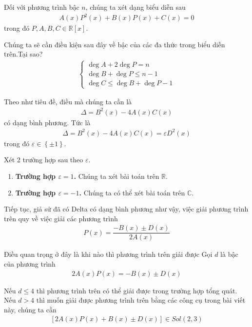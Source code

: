 \documentclass[a4paper,oneside]{book}
\numberwithin{equation}{chapter}
\begin{document}
Đối với phương trình bậc $n$, chúng ta xét dạng biểu diễn sau
\begin{align}
A\left( x \right){P^2}\left( x \right) + B\left( x \right)P\left( x \right) + C\left( x \right) = 0
\end{align}
trong đó $P,A,B,C \in \mathbb{R} \left[ x \right]$.

Chúng ta sẽ cần điều kiện sau đây về bậc của các đa thức trong biểu diễn trên.Tại sao?
\begin{align}
\left\{ {\begin{array}{*{20}{c}}
{\deg A + 2\deg P = n}\\
{\deg B + \deg P \le n - 1}\\
{\deg C \le \deg B + \deg P - 1}
\end{array}} \right.
\end{align}

Theo như tiêu đề, điều mà chúng ta cần là 
\begin{align}
\Delta  = {B^2}\left( x \right) - 4A\left( x \right)C\left( x \right)
\end{align}
có dạng bình phương. Tức là
\begin{align}
\Delta  = {B^2}\left( x \right) - 4A\left( x \right)C\left( x \right) = \varepsilon {D^2}\left( x \right)
\end{align}
trong đó $\varepsilon  \in \left\{ { \pm 1} \right\}$.

Xét 2 trường hợp sau theo $\varepsilon$.
\begin{enumerate}
\item \textbf{Trường hợp $\varepsilon  = 1$.} Chúng ta xét bài toán trên $\mathbb{R}$.
\item \textbf{Trường hợp $\varepsilon  = -1$.} Chúng ta có thể xét bài toán trên $\mathbb{C}$.
\end{enumerate}

Tiếp tục, giả sử đã có Delta có dạng bình phương như vậy, việc giải phương trình trên quy về việc giải các phương trình
\begin{align}
P\left( x \right) = \dfrac{{ - B\left( x \right) \pm D\left( x \right)}}{{2A\left( x \right)}}
\end{align}

Điều quan trọng ở đây là khi nào thì phương trình trên giải được
Gọi $d$ là bậc của phương trình 
\begin{align}
2A\left( x \right)P\left( x \right) =  - B\left( x \right) \pm D\left( x \right)
\end{align}

Nếu $d \le 4$ thì phương trình trên có thể giải được trong trường hợp tổng quát. Nếu $d>4$ thì muốn giải được phương trình trên bằng các công cụ trong bài viết này, chúng ta cần 
\begin{align}
\left[ {2A\left( x \right)P\left( x \right) + B\left( x \right) \pm D\left( x \right)} \right] \in Sol\left( {2,3} \right)
\end{align}
\end{document}
